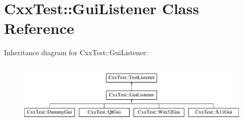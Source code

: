 \hypertarget{classCxxTest_1_1GuiListener}{\section{Cxx\-Test\-:\-:Gui\-Listener Class Reference}
\label{classCxxTest_1_1GuiListener}
}
Inheritance diagram for Cxx\-Test\-:\-:Gui\-Listener\-:\begin{figure}[H]
\begin{center}
\leavevmode
\includegraphics[height=3.000000cm]{classCxxTest_1_1GuiListener}
\end{center}
\end{figure}

